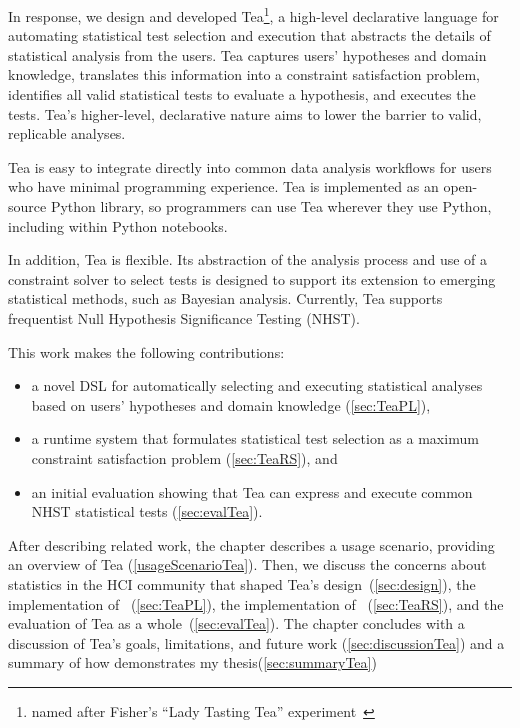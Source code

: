 In response, we design and developed Tea\footnote{named after Fisher's ``Lady
Tasting Tea'' experiment~\cite{fisher1937design}}, a high-level declarative
language for automating statistical test selection and execution that abstracts
the details of statistical analysis from the users. Tea captures users'
hypotheses and domain knowledge, translates this information into a constraint
satisfaction problem, identifies all valid statistical tests to evaluate a
hypothesis, and executes the tests. Tea's higher-level, declarative nature aims
to lower the barrier to valid, replicable analyses.

Tea is easy to integrate directly into common data analysis workflows for users
who have minimal programming experience. Tea is implemented as an open-source
Python library, so programmers can use Tea wherever they use Python, including
within Python notebooks.

In addition, Tea is flexible. Its abstraction of the analysis process and use of
a constraint solver to select tests is designed to support its extension to
emerging statistical methods, such as Bayesian analysis. Currently, Tea supports
frequentist Null Hypothesis Significance Testing (NHST).

This work makes the following contributions:
\begin{itemize}
    \item a novel DSL for automatically selecting and executing statistical
    analyses based on users' hypotheses and domain knowledge
    (\autoref{sec:TeaPL}), 
    \item a runtime system that formulates statistical test selection as a maximum constraint satisfaction problem (\autoref{sec:TeaRS}), and
    \item an initial evaluation showing that Tea can express and execute common NHST statistical tests (\autoref{sec:evalTea}). 
\end{itemize}

After describing related work, the chapter describes a usage scenario, providing
an overview of Tea (\autoref{usageScenarioTea}). Then, we discuss the concerns
about statistics in the HCI community that shaped Tea's
design~(\autoref{sec:design}), the implementation of
\TeaPL~(\autoref{sec:TeaPL}), the implementation of
\TeaRS~(\autoref{sec:TeaRS}), and the evaluation of Tea as a
whole~(\autoref{sec:evalTea}). The chapter concludes with a discussion of Tea's
goals, limitations, and future work (\autoref{sec:discussionTea}) and a summary
of how \tea demonstrates my thesis(\autoref{sec:summaryTea})

